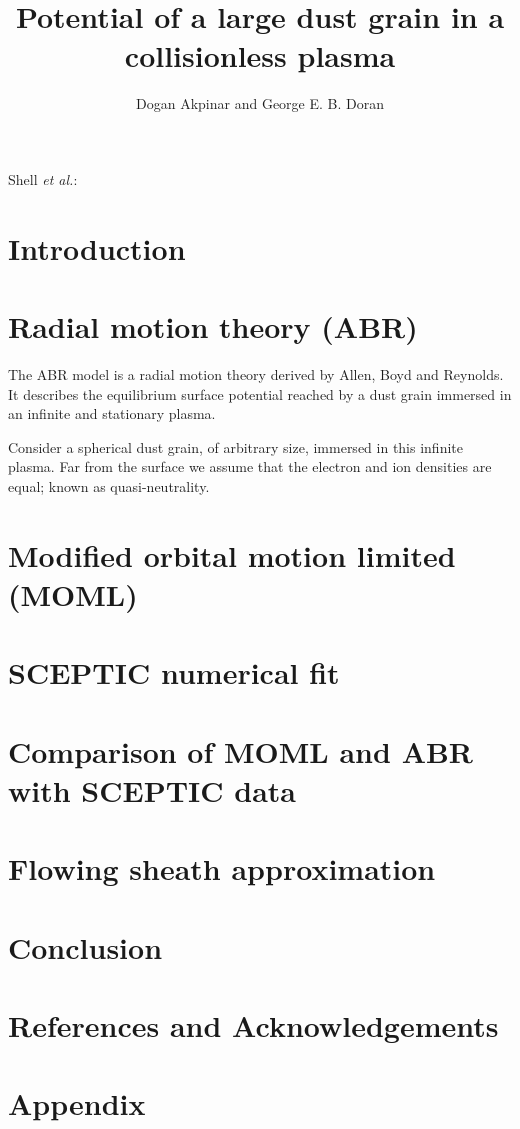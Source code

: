 \documentclass[journal]{Imperial_lab_report}
\begin{document}
\title{Potential of a large dust grain in a collisionless plasma}
\author{Dogan Akpinar and George E. B. Doran}
{Shell \MakeLowercase{\textit{et al.}}:}

\maketitle

\begin{abstract}

\end{abstract}

\section{Introduction}

\section{Radial motion theory (ABR)}
\smallskip

The ABR model is a radial motion theory derived by Allen, Boyd and Reynolds. It describes the equilibrium surface potential reached 
by a dust grain immersed in an infinite and stationary plasma.

\smallskip

Consider a spherical dust grain, of arbitrary size, immersed in this infinite plasma. Far from the surface we assume that the electron
and ion densities are equal; known as quasi-neutrality. 

\section{Modified orbital motion limited (MOML)}
\section{SCEPTIC numerical fit}
\section{Comparison of MOML and ABR with SCEPTIC data}
\section{Flowing sheath approximation}
\section{Conclusion}
\section{References and Acknowledgements}











\section{Appendix}
\end{document}
